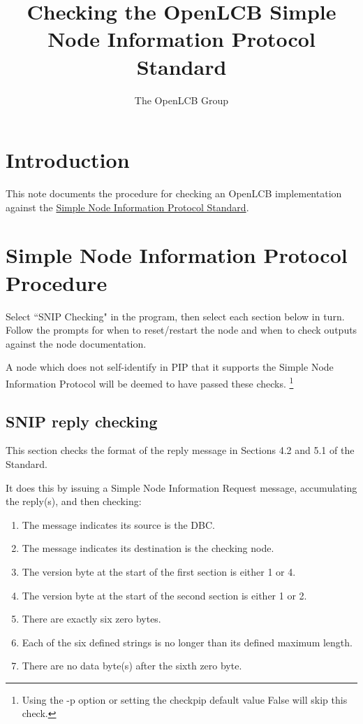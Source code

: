 \documentclass[11pt]{article}
\title{Checking the OpenLCB Simple Node Information Protocol Standard}
\author{The OpenLCB Group}
\begin{document}
\maketitle


\section{Introduction}

This note documents the procedure for checking an OpenLCB implementation against the 
\href{https://nbviewer.org/github/openlcb/documents/blob/master/standards/SimpleNodeInformationS.pdf}
    {Simple Node Information Protocol Standard}.



\section{Simple Node Information Protocol Procedure}

Select ``SNIP Checking" in the program, 
then select each section below in turn.  Follow the prompts
for when to reset/restart the node and when to check 
outputs against the node documentation.

A node which does not self-identify in PIP that it supports
the Simple Node Information Protocol will be deemed to have passed these checks.
\footnote{Using the -p option or setting the checkpip default value False will skip this check.}

\subsection{SNIP reply checking}

This section checks the format of the reply message in Sections 4.2 and 5.1 of the Standard.

It does this by issuing a Simple Node Information Request message, 
accumulating the reply(s), and then checking:
    \begin{enumerate}
    \item The message indicates its source is the DBC.
    \item The message indicates its destination is the checking node.
    \item The version byte at the start of the first section is either 1 or 4.
    \item The version byte at the start of the second section is either 1 or 2.
    \item There are exactly six zero bytes.
    \item Each of the six defined strings is no longer than its defined maximum length.
    \item There are no data byte(s) after the sixth zero byte.
    \end{enumerate}
\end{document}
